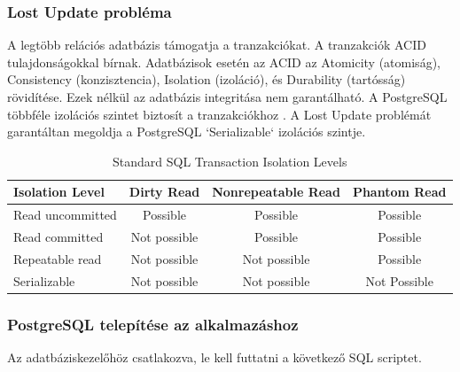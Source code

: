 \subsubsection{Lost Update probléma}
A legtöbb relációs adatbázis támogatja a tranzakciókat. A tranzakciók ACID tulajdonságokkal bírnak.
Adatbázisok esetén az ACID az Atomicity (atomiság), Consistency (konzisztencia), Isolation (izoláció), és Durability (tartósság) rövidítése. Ezek nélkül az adatbázis integritása nem garantálható.
A PostgreSQL többféle izolációs szintet biztosít a tranzakciókhoz \cite{postgres-transaction}. A Lost Update problémát garantáltan megoldja a PostgreSQL `Serializable` izolációs szintje.
\begin{table}[h]
    \centering
    \caption{ Standard SQL Transaction Isolation Levels}
    \begin{tabular}{l|c|c|c|}
Isolation Level & Dirty Read  & Nonrepeatable Read & Phantom Read\\
        \hline
Read uncommitted  & Possible & Possible & Possible \\
\hline
Read committed & Not possible & Possible & Possible \\
\hline
Repeatable read & Not possible & Not possible & Possible \\
\hline
Serializable & Not possible & Not possible & Not Possible \\
        \hline
    \end{tabular}
\end{table}

\subsubsection{PostgreSQL telepítése az alkalmazáshoz}\label{subsubsec:postgresql-telepítése-a-programhoz}

Az adatbáziskezelőhöz csatlakozva, le kell futtatni a következő SQL scriptet.

